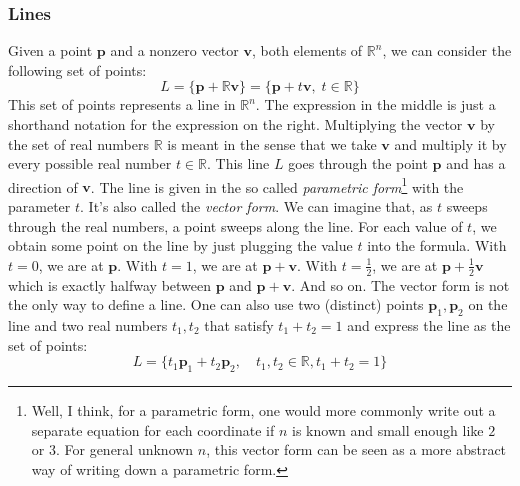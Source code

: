 
\subsubsection{Lines}
Given a point $\mathbf{p}$ and a nonzero vector $\mathbf{v}$, both elements of $\mathbb{R}^n$, we can consider the following set of points:
\begin{equation}
 L 
 =
 \{\mathbf{p} + \mathbb{R} \mathbf{v} \} 
 = 
 \{ \mathbf{p} + t \mathbf{v}, \; t \in \mathbb{R} \}
\end{equation}
This set of points represents a line in $\mathbb{R}^n$. The expression in the middle is just a shorthand notation for the expression on the right. Multiplying the vector $\mathbf{v}$ by the set of real numbers $\mathbb{R}$ is meant in the sense that we take $\mathbf{v}$ and multiply it by every possible real number $t \in \mathbb{R}$. This line $L$ goes through the point $\mathbf{p}$ and has a direction of $\mathbf{v}$. The line is given in the so called \emph{parametric form}\footnote{Well, I think, for a parametric form, one would more commonly write out a separate equation for each coordinate if $n$ is known and small enough like $2$ or $3$. For general unknown $n$, this vector form can be seen as a more abstract way of writing down a parametric form.} with the parameter $t$. It's also called the \emph{vector form}. We can imagine that, as $t$ sweeps through the real numbers, a point sweeps along the line. For each value of $t$, we obtain some point on the line by just plugging the value $t$ into the formula. With $t=0$, we are at $\mathbf{p}$. With $t=1$, we are at $\mathbf{p + v}$. With $t=\frac{1}{2}$, we are at $\mathbf{p} + \frac{1}{2} \mathbf{v}$ which is exactly halfway between $\mathbf{p}$ and $\mathbf{p + v}$. And so on. The vector form is not the only way to define a line. One can also use two (distinct) points $\mathbf{p}_1,\mathbf{p}_2$ on the line and two real numbers $t_1, t_2$ that satisfy $t_1 + t_2 = 1$ and express the line as the set of points:
\begin{equation}
 L = \{ t_1 \mathbf{p}_1 + t_2 \mathbf{p}_2,  \quad t_1, t_2 \in \mathbb{R}, t_1 + t_2 = 1 \}
\end{equation}
